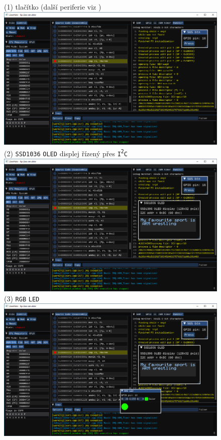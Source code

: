 \documentclass[compress]{beamer}
\begin{document}
\begin{frame}
	\centering \Large
	\begin{overlayarea}{\textwidth}{\textheight}
		\begin{figure}
			\centering
			{%
				\normalsize \textcolor{UBCblue}{(1) tlačítko (další periferie viz  \href{https://home.zcu.cz/~ublm/files/os/kiv-dpp-01-en.pdf}{})}\\
				\vspace{0.1cm}
				\includegraphics[width=.85\textwidth]{img/screenshot-02.pdf}%
			}%
			\only<2>
			{%
				\normalsize \textcolor{UBCblue}{(2) \texttt{SSD1036} \texttt{OLED} displej řízený přes \texttt{I\textsuperscript{2}C}}\\
				\vspace{0.075cm}
				\includegraphics[width=.85\textwidth]{img/screenshot-03.pdf}%
			}%
			\only<3>
			{%
				\normalsize \textcolor{UBCblue}{(3) \texttt{RGB} \texttt{LED}}\\
				\vspace{0.1cm}
				\includegraphics[width=.85\textwidth]{img/screenshot-04.pdf}%
}
\end{figure}
\end{overlayarea}
\end{frame}
\end{document}
